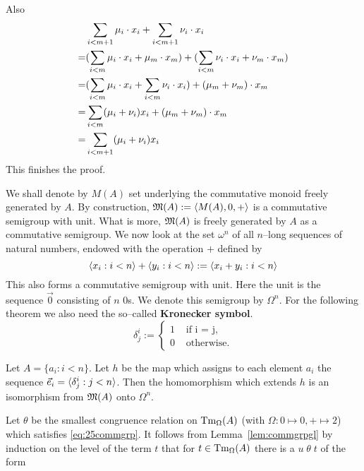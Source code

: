 Also 
\begin{align}
 & \sum_{i < m+1} \mu_i \cdot x_i + \sum_{i < m+1} \nu_i\cdot  x_i 
\\\notag 
= & (\sum_{i < m} \mu_i \cdot x_i + \mu_m \cdot x_m) 
	+ (\sum_{i < m} \nu_i\cdot  x_i + \nu_m \cdot x_m) \\\notag 
= & (\sum_{i < m} \mu_i \cdot x_i + \sum_{i < m} \nu_i \cdot x_i)  
	+ (\mu_m + \nu_m) \cdot x_m \\\notag 
= & \sum_{i < m} (\mu_i + \nu_i) x_i + (\mu_m + \nu_m) \cdot x_m 
	\\\notag
= & \sum_{i < m+1} (\mu_i + \nu_i) x_i
\end{align}
This finishes the proof.
\proofend

We shall denote by $M(A)$ set underlying the commutative monoid freely 
generated by $A$. By construction, $\mathfrak{M}(A) := \langle M(A), 0, +\rangle$ 
is a commutative
semigroup with unit. What is more, $\mathfrak{M}(A)$ is freely generated by
$A$ as a commutative semigroup. We now look at the set $\omega^n$ of 
all $n$--long sequences of natural numbers, endowed with the operation 
$+$ defined by
\begin{equation}
\langle x_i : i < n\rangle + \langle y_i : i< n\rangle := \langle x_i + y_i :
i < n\rangle 
\end{equation}
This also forms a commutative semigroup with unit. Here the
unit is the sequence $\vec{0}$ consisting of $n$ 0s. We denote this
semigroup by $\Omega^n$. For the following theorem we also need
the so--called
\textbf{Kronecker symbol}.
\begin{equation}
\delta^i_j := \begin{cases}
1 & \text{ if i = j,} \\
0 & \text{ otherwise.}
\end{cases}
\end{equation}
\begin{thm}
Let $A = \{a_i : i < n\}$. Let $h$ be the map
which assigns to each element $a_i$ the sequence
$\vec{e}_i = \langle \delta^i_j : j < n\rangle$. Then the homomorphism
which extends $h$ is an isomorphism from $\mathfrak{M}(A)$
onto $\Omega^n$.
\end{thm}
\proofbeg
Let $\theta$ be the smallest congruence relation on
$\operatorname{Tm}_{\Omega}(A)$ (with $\Omega \colon 0 \mapsto 0, + \mapsto 2$)
which satisfies \eqref{eq:25commgrp}. It follows from 
Lemma~\ref{lem:commgrpgl} by induction on the level of the 
term $t$ that for $t \in \operatorname{Tm}_{\Omega}(A)$ 
there is a $u\; \theta \; t$ of the form

